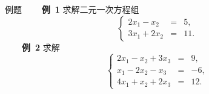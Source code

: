 \documentclass[compress,mathserif,cjk]{beamer}
\theoremstyle{remark}
\numberwithin{equation}{section}
\newcommand{\hei}{\bf}      %
\newcommand{\xiaoerhao}{\fontsize{18pt}{\baselineskip}\selectfont}  %
\begin{document}
\begin{CJK}{UTF8}{gbsn}
\begin{frame}{例题}
\ \ \ \ {\hei 例~1} 求解二元一次方程组
$$\left\{\begin{array}{rcl}
2x_1-x_2&=&5,\\3x_1+2x_2&=&11.
\end{array}\right.$$
 \pause\vskip5pt
 \ \ \ \ {\hei 例~2} 求解
 $$\left\{\begin{array}{rcl}
 2x_1-x_2+3x_3&=&9,\\x_1-2x_2-x_3&=&-6,\\4x_1+x_2+2x_3&=&12.
 \end{array}\right.$$
\end{frame}




\begin{frame}
\begin{center}
{\textcolor[rgb]{0.50,0.00,1.00}{\textbf{\xiaoerhao{Thanks for your attention!}}}}\bigskip
\end{center}
\end{frame}
\end{CJK}
\end{document}
